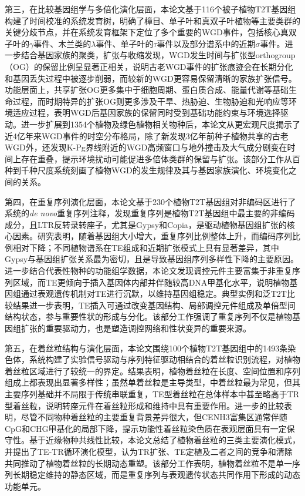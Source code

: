 第三，在比较基因组学与多倍化演化层面，本论文基于116个被子植物T2T基因组构建了时间校准的系统发育树，明确了樟目、单子叶和真双子叶植物等主要类群的关键分歧节点，并在系统发育框架下定位了多个重要的WGD事件，包括核心真双子叶的$\gamma$事件、木兰类的$\lambda$事件、单子叶的$\tau$事件以及部分谱系中的近期$\sigma$事件。进一步结合基因家族的聚类，扩张与收缩发现，WGD发生时间与扩张型orthogroup（OG）的保留比例呈显著正相关，说明古老WGD事件的扩张痕迹会在长期分化和基因丢失过程中被逐步削弱，而较新的WGD更容易保留清晰的家族扩张信号。功能层面上，共享扩张OG更多集中于细胞周期、蛋白质合成、能量代谢等基础生命过程，而时期特异的扩张OG则更多涉及干旱、热胁迫、生物胁迫和光响应等环境适应过程，表明WGD后基因家族的保留同时受到基础功能约束与环境选择驱动。进一步扩展到1354个植物及绿色植物相关物种后，本论文从更宏观尺度揭示了近4亿年来WGD事件的时空分布格局，除了新发现3亿年前种子植物共享的古老WGD外，还发现K-Pg界线附近的WGD高频窗口与地外撞击及大气成分剧变在时间上存在重叠，提示环境扰动可能促进多倍体类群的保留与扩张。该部分工作从百种到千种尺度系统刻画了植物WGD的发生规律及其与基因家族演化、环境变化之间的关系。

第四，在重复序列演化层面，本论文基于230个植物T2T基因组对非编码区进行了系统的\textit{de novo}重复序列注释，发现重复序列是植物T2T基因组中最主要的非编码成分，且LTR反转录转座子，尤其是Gypsy和Copia，是驱动植物基因组扩张的核心因素。研究表明，随着基因组大小增大，重复序列比例整体上升，而编码序列比例相对下降；不同植物谱系在TE组成和近期扩张模式上具有显著差异，其中Gypsy与基因组扩张关系最为密切，且是导致基因组序列多样性下降的主要原因。进一步结合代表性物种的功能组学数据，本论文发现调控元件主要富集于非重复序列区域，而TE更倾向于插入基因体内部并伴随较高DNA甲基化水平，说明植物基因组通过表观遗传机制对TE进行沉默，以维持基因组稳定。典型实例和泛T2T比较结果进一步表明，TE插入可通过改变基因结构、局部调控元件组成及单倍型间结构状态，参与重要性状的形成与分化。该部分工作强调了重复序列不仅是植物基因组扩张的重要驱动力，也是塑造调控网络和性状变异的重要来源。

第五，在着丝粒结构与演化层面，本论文围绕100个植物T2T基因组中的1493条染色体，系统构建了实验信号驱动与序列特征驱动相结合的着丝粒识别流程，对植物着丝粒区域进行了较统一的界定。结果表明，植物着丝粒在长度、空间位置和序列组成上都表现出显著多样性；虽然单着丝粒是主导类型，中着丝粒最为常见，但其主要序列基础并不局限于传统串联重复，TE型着丝粒在总体样本中甚至略高于TR型着丝粒，说明转座元件在着丝粒形成和维持中具有重要作用。进一步的比较表明，尽管不同物种着丝粒的主要重复背景差异很大，但CENH3富集区通常伴随CpG和CHG甲基化的局部下降，提示功能性着丝粒染色质在表观层面具有一定保守性。基于近缘物种共线性比较，本论文总结了植物着丝粒的三类主要演化模式，并提出了TE-TR循环演化模型，认为TR扩张、TE定植及二者之间的竞争和清除共同推动了植物着丝粒的长期动态重塑。该部分工作表明，植物着丝粒不是单一序列长期稳定维持的静态区域，而是重复序列与表观遗传状态共同作用下形成的动态功能单元。

